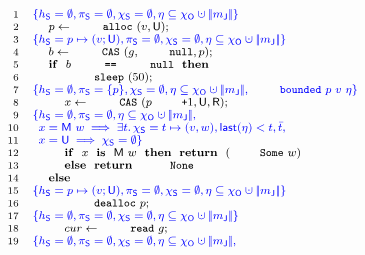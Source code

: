 {
\begin{figure}
\centering
\[
{\small{
\begin{array}{rl}
 \Num{1} & \specK{\{\heaps = \emptyset, \perms = \emptyset, \hists = \emptyset, \gist \subseteq \histo \hunion \mygather{\pending} \}}
\\ 
 \Num{2} & ~~~~ p \Asgn \esc{alloc}~(v, \Unmatched);\\
 \Num{3} & \specK{\{\heaps = p \mapsto (v; \Unmatched), \perms = \emptyset, \hists = \emptyset, \gist \subseteq \histo \hunion \mygather{\pending} \}}\\
 \Num{4} & ~~~~ b \Asgn \esc{CAS}~(g, \esc{null}, p);\\
 \Num{5} & ~~~~ \kw{if}~~b~\esc{==}~\esc{null}~~\kw{then}\\
 \Num{6} & ~~~~ ~~~~ \esc{sleep}~(50);\\
 \Num{7} & \specK{\{\heaps = \emptyset, \perms = \{p\}, \hists = \emptyset, \gist \subseteq \histo \hunion \mygather{\pending}, \esc{bounded}\ p\ v\ \gist \}}\\
 \Num{8} & ~~~~ ~~~~ x \Asgn \esc{CAS}~(p\esc{+}1, \Unmatched, \Retired);\\
 \Num{9} & \specK{\{\heaps = \emptyset, \perms = \emptyset, \gist \subseteq \histo \hunion \mygather{\pending},\hbox{}} \\
\Num{10} & \specK{\hphantom{\}}x = \Matched w \implies \exists t\ldot \hists = t \mapsto (v, w), \mathsf{last}(\gist) < t, \twin t,}\\
\Num{11} & \specK{\hphantom{\}}x = \Unmatched \implies \hists = \emptyset \}}\\
\Num{12} & ~~~~ ~~~~ \kw{if}~~x~~\kw{is}~~\Matched w~~\kw{then}~~\kw{return}~~(\esc{Some}~w)\\
\Num{13} & ~~~~ ~~~~ \kw{else}~~\kw{return}~~\esc{None}\\
\Num{14} & ~~~~ \kw{else}\\
\Num{15} & \specK{\{\heaps = p \mapsto (v; \Unmatched), \perms = \emptyset, \hists = \emptyset, \gist \subseteq \histo \hunion \mygather{\pending}\}}\\
\Num{16} & ~~~~ ~~~~ \esc{dealloc}~p;\\
\Num{17} & \specK{\{\heaps = \emptyset, \perms = \emptyset, \hists = \emptyset, \gist \subseteq \histo \hunion \mygather{\pending}\}}\\
\Num{18} & ~~~~ ~~~~ cur \Asgn \esc{read}~g;\\
\Num{19} & \specK{\{\heaps = \emptyset, \perms = \emptyset, \hists = \emptyset, \gist \subseteq \histo \hunion \mygather{\pending},}\\

\end{array}}}\]
\end{figure}}
